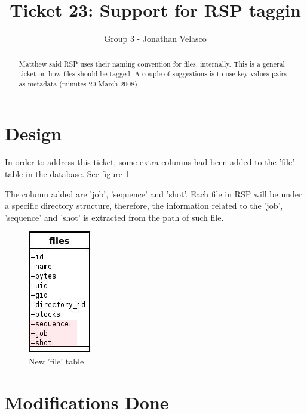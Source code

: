 \documentclass[a4paper,10pt]{article}
\title{Ticket 23: Support for RSP taggin}
\author{Group 3 - Jonathan Velasco}
\begin{document}
\maketitle

\begin{abstract}

Matthew said RSP uses their naming convention for files, internally.  This is a general ticket on how files should be tagged.  A couple of suggestions is to use key-values pairs as metadata  (minutes 20 March 2008)

\end{abstract}

\section{Design}

In order to address this ticket, some extra columns had been added to the 'file' table in the database.  See figure \ref{fig:filetable}

The column added are 'job', 'sequence' and 'shot'.  Each file in RSP will be under a specific directory structure, therefore, the information related to the 'job', 'sequence' and 'shot' is extracted from the path of such file.

\begin{figure}[h]
 \centering
 \includegraphics[scale=0.5]{images/fileTableModified.jpg}
 \caption{New 'file' table}
 \label{fig:filetable}
\end{figure}

\section{Modifications Done}
\end{document}
